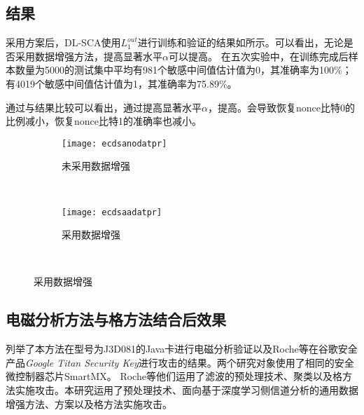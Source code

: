 {{	\subsection{\jiashejianyanguji 结果}
	采用\jiashejianyanguji 方案后，DL-SCA使用$L_1^{out}$进行训练和验证的结果如所示。可以看出，无论是否采用数据增强方法，提高显著水平$\alpha$可以提高\zyx 。%
	在五次实验中，在训练完成后样本数量为5000的测试集中平均有981个敏感中间值估计值为0，其准确率为100\%；有4019个敏感中间值估计值为1，其准确率为75.89\%。

	通过与\shujuzengqiang 结果比较可以看出，\jiashejianyanguji 通过提高显著水平$\alpha$，提高\zyx。\jiashejianyanguji 会导致恢复nonce比特0的比例减小，恢复nonce比特1的准确率也减小。
	
	\begin{figure}[!h]
		\centering
		\begin{subfigure}[b]{\twof\textwidth}
			\texttt{[image: ecdsanodatpr]}
			\caption{未采用数据增强}
			\label{fig:ecdsanodatpr}
		\end{subfigure}%
		~%
		\begin{subfigure}[b]{\twof\textwidth}
			\texttt{[image: ecdsaadatpr]}
			\caption{采用数据增强}
			\label{fig:ecdsaadatpr}
		\end{subfigure}
		\\
		\label{fig:ecdsatpr}
	\end{figure}
	
	
	\subsection{电磁分析方法与格方法结合后效果}
	{\color{\xchange}
	
	列举了本方法在型号为J3D081的Java卡进行电磁分析验证以及Roche等\citep{Roche21}在谷歌安全产品\textit{Google Titan Security Key}\citep{Titan}进行攻击的结果。两个研究对象使用了相同的安全微控制器芯片SmartMX\citep{p5x}。%
	Roche等\citep{Roche21}他们运用了滤波的预处理技术、聚类以及格方法实施攻击。本研究运用了\yuchuli 预处理技术、面向基于深度学习侧信道分析的通用数据增强方法、\jiashejianyanguji 方案以及格方法实施攻击。
	
}}}
